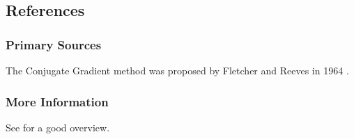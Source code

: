 



\subsection{References}

\subsubsection{Primary Sources}
The Conjugate Gradient method was proposed by Fletcher and Reeves in 1964 \cite{Fletcher1964}.

\subsubsection{More Information}

See \cite{Shewchuk1994} for a good overview.



